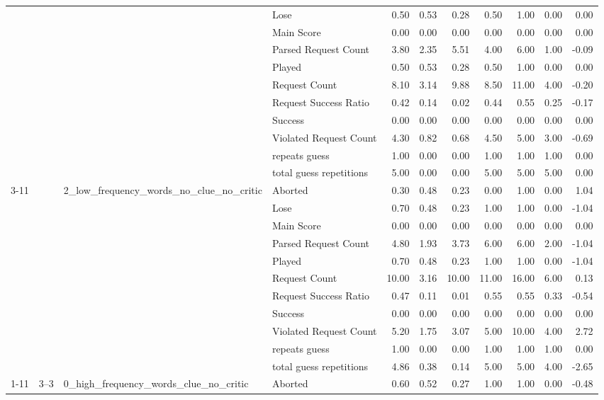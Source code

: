 \begin{tabular}{llllrrrrrrr}
 &  &  & Lose & 0.50 & 0.53 & 0.28 & 0.50 & 1.00 & 0.00 & 0.00 \\
 &  &  & Main Score & 0.00 & 0.00 & 0.00 & 0.00 & 0.00 & 0.00 & 0.00 \\
 &  &  & Parsed Request Count & 3.80 & 2.35 & 5.51 & 4.00 & 6.00 & 1.00 & -0.09 \\
 &  &  & Played & 0.50 & 0.53 & 0.28 & 0.50 & 1.00 & 0.00 & 0.00 \\
 &  &  & Request Count & 8.10 & 3.14 & 9.88 & 8.50 & 11.00 & 4.00 & -0.20 \\
 &  &  & Request Success Ratio & 0.42 & 0.14 & 0.02 & 0.44 & 0.55 & 0.25 & -0.17 \\
 &  &  & Success & 0.00 & 0.00 & 0.00 & 0.00 & 0.00 & 0.00 & 0.00 \\
 &  &  & Violated Request Count & 4.30 & 0.82 & 0.68 & 4.50 & 5.00 & 3.00 & -0.69 \\
 &  &  & repeats guess & 1.00 & 0.00 & 0.00 & 1.00 & 1.00 & 1.00 & 0.00 \\
 &  &  & total guess repetitions & 5.00 & 0.00 & 0.00 & 5.00 & 5.00 & 5.00 & 0.00 \\
\cline{3-11}
 &  & \multirow[t]{11}{*}{2_low_frequency_words_no_clue_no_critic} & Aborted & 0.30 & 0.48 & 0.23 & 0.00 & 1.00 & 0.00 & 1.04 \\
 &  &  & Lose & 0.70 & 0.48 & 0.23 & 1.00 & 1.00 & 0.00 & -1.04 \\
 &  &  & Main Score & 0.00 & 0.00 & 0.00 & 0.00 & 0.00 & 0.00 & 0.00 \\
 &  &  & Parsed Request Count & 4.80 & 1.93 & 3.73 & 6.00 & 6.00 & 2.00 & -1.04 \\
 &  &  & Played & 0.70 & 0.48 & 0.23 & 1.00 & 1.00 & 0.00 & -1.04 \\
 &  &  & Request Count & 10.00 & 3.16 & 10.00 & 11.00 & 16.00 & 6.00 & 0.13 \\
 &  &  & Request Success Ratio & 0.47 & 0.11 & 0.01 & 0.55 & 0.55 & 0.33 & -0.54 \\
 &  &  & Success & 0.00 & 0.00 & 0.00 & 0.00 & 0.00 & 0.00 & 0.00 \\
 &  &  & Violated Request Count & 5.20 & 1.75 & 3.07 & 5.00 & 10.00 & 4.00 & 2.72 \\
 &  &  & repeats guess & 1.00 & 0.00 & 0.00 & 1.00 & 1.00 & 1.00 & 0.00 \\
 &  &  & total guess repetitions & 4.86 & 0.38 & 0.14 & 5.00 & 5.00 & 4.00 & -2.65 \\
\cline{1-11} \cline{2-11} \cline{3-11}
\multirow[t]{297}{*}{wordle_withclue} & \multirow[t]{33}{*}{3--3} & \multirow[t]{11}{*}{0_high_frequency_words_clue_no_critic} & Aborted & 0.60 & 0.52 & 0.27 & 1.00 & 1.00 & 0.00 & -0.48 \\

\end{tabular}
